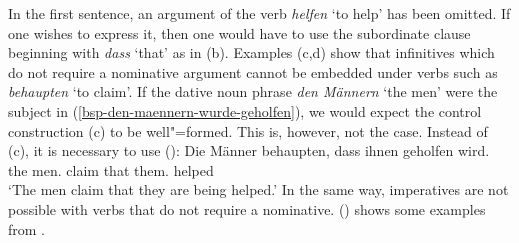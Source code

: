 \eal
{}
\zl
%
In the first sentence, an argument of the verb \emph{helfen} `to help' has been omitted. If one wishes to express it, then one would have to use
the subordinate clause beginning with \emph{dass} `that' as in (b). Examples (c,d) show that infinitives which do not require a nominative argument cannot be embedded
under verbs such as \emph{behaupten} `to claim'. If the dative noun phrase \emph{den Männern} `the
men' were the subject in (\ref{bsp-den-maennern-wurde-geholfen}), we would expect the control
construction (c) to be well"=formed. This is, however, not the case. Instead of (c), it is necessary to use ():
\ea
\gll Die Männer     behaupten, dass ihnen       geholfen wird.\\
     the men.\nom{} claim      that them.\dat{} helped   \AUX\\
\glt `The men claim that they are being helped.'
\z
%
In the same way, imperatives are not possible with verbs that do not require a nominative. () shows some examples from \citet[]{Reis82}.
\eal
{}
